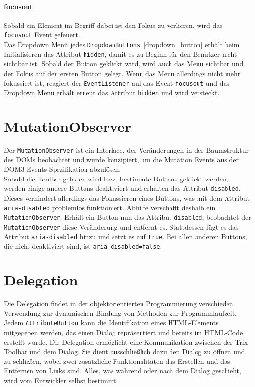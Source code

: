 \paragraph{focusout}
Sobald ein Element im Begriff dabei ist den Fokus zu verlieren, wird das \texttt{focusout} Event gefeuert.\\
Das Dropdown Menü jedes \texttt{DropdownButtons}~\ref{dropdown_button} erhält beim Initialisieren das Attribut \texttt{hidden}, damit es zu Beginn für den Benutzer nicht sichtbar ist. Sobald der Button geklickt wird, wird auch das Menü sichtbar und der Fokus auf den ersten Button gelegt. Wenn das Menü allerdings nicht mehr fokussiert ist, reagiert der \texttt{EventListener} auf das Event \texttt{focusout} und das Dropdown Menü erhält erneut das Attribut \texttt{hidden} und wird versteckt.

\section{MutationObserver}
Der \texttt{MutationObserver} ist ein Interface, der Veränderungen in der Baumstruktur des DOMs beobachtet und wurde konzipiert, um die Mutation Events aus der DOM3 Events Spezifikation abzulösen.\\
Sobald die Toolbar geladen wird bzw. bestimmte Buttons geklickt werden, werden einige andere Buttons deaktiviert und erhalten das Attribut \texttt{disabled}. Dieses verhindert allerdings das Fokussieren eines Buttons, was mit dem Attribut \texttt{aria-disabled} problemlos funktioniert. Abhilfe verschafft deshalb ein \texttt{MutationObserver}. Erhält ein Button nun das Attribut \texttt{disabled}, beobachtet der \texttt{MutationObserver} diese Veränderung und entfernt es. Stattdessen fügt es das Attribut \texttt{aria-disabled} hinzu und setzt es auf \texttt{true}. Bei allen anderen Buttons, die nicht deaktiviert sind, ist \texttt{aria-disabled=false}.

\section{Delegation}
Die Delegation findet in der objektorientierten Programmierung verschieden Verwendung zur dynamischen Bindung von Methoden zur Programmlaufzeit.\\
Jedem \texttt{AttributeButton} kann die Identifikation eines HTML-Elements mitgegeben werden, das einen Dialog repräsentiert und bereits im HTML-Code erstellt wurde. Die Delegation ermöglicht eine Kommunikation zwischen der Trix-Toolbar und dem Dialog. Sie dient ausschließlich dazu den Dialog zu öffnen und zu schließen, wobei zwei zusätzliche Funktionalitäten das Erstellen und das Entfernen von Links sind. Alles, was während oder nach dem Dialog geschieht, wird vom Entwickler selbst bestimmt.

